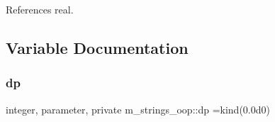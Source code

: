 References real.



\subsection{Variable Documentation}
\mbox{\label{namespacem__strings__oop_aff89e0d0502f39fedc4f8a9cf793fdba}} 
\subsubsection{\texorpdfstring{dp}{dp}}
{\footnotesize\ttfamily integer, parameter, private m\+\_\+strings\+\_\+oop\+::dp =kind(0.\+0d0)\hspace{0.3cm}{\ttfamily [private]}}

